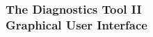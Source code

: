 \documentclass[10pt]{beamer}
\begin{document}
{



\begin{frame}[fragile]
  \frametitle{{ }\\The Diagnostics Tool II\\Graphical User Interface}

\vspace{3cm}


\end{frame}}
\end{document}
